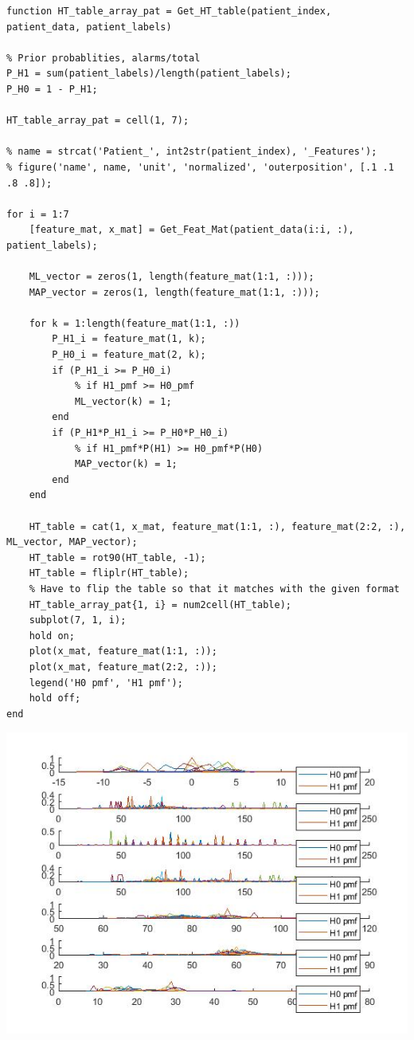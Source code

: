 \documentclass{article}
\begin{document}
\begin{lstlisting}
function HT_table_array_pat = Get_HT_table(patient_index, patient_data, patient_labels)

% Prior probablities, alarms/total
P_H1 = sum(patient_labels)/length(patient_labels);
P_H0 = 1 - P_H1;

HT_table_array_pat = cell(1, 7);

% name = strcat('Patient_', int2str(patient_index), '_Features');
% figure('name', name, 'unit', 'normalized', 'outerposition', [.1 .1 .8 .8]);

for i = 1:7
	[feature_mat, x_mat] = Get_Feat_Mat(patient_data(i:i, :), patient_labels);

	ML_vector = zeros(1, length(feature_mat(1:1, :)));
	MAP_vector = zeros(1, length(feature_mat(1:1, :)));

	for k = 1:length(feature_mat(1:1, :))
		P_H1_i = feature_mat(1, k);
		P_H0_i = feature_mat(2, k);
		if (P_H1_i >= P_H0_i)
			% if H1_pmf >= H0_pmf
			ML_vector(k) = 1;
		end
		if (P_H1*P_H1_i >= P_H0*P_H0_i)
			% if H1_pmf*P(H1) >= H0_pmf*P(H0)
			MAP_vector(k) = 1;
		end
	end

	HT_table = cat(1, x_mat, feature_mat(1:1, :), feature_mat(2:2, :), ML_vector, MAP_vector);
	HT_table = rot90(HT_table, -1);
	HT_table = fliplr(HT_table);
	% Have to flip the table so that it matches with the given format
	HT_table_array_pat{1, i} = num2cell(HT_table);
	subplot(7, 1, i);
 	hold on;
 	plot(x_mat, feature_mat(1:1, :));
 	plot(x_mat, feature_mat(2:2, :));
 	legend('H0 pmf', 'H1 pmf');
 	hold off;
end
\end{lstlisting}
\includegraphics[scale = 0.7]{untitled}
\end{document}
